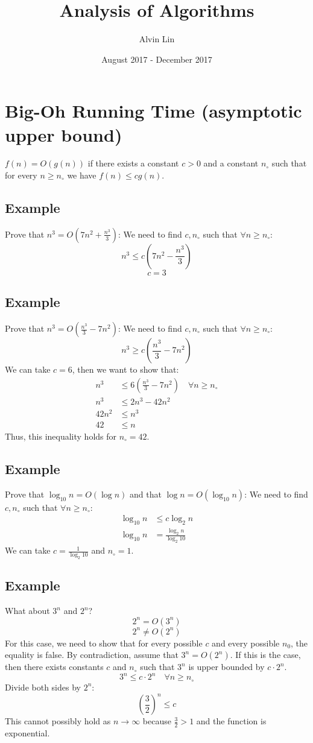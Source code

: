 \documentclass{math}
\title{Analysis of Algorithms}
\author{Alvin Lin}
\date{August 2017 - December 2017}
\begin{document}
\maketitle

\section*{Big-Oh Running Time (asymptotic upper bound)}
\( f(n) = O(g(n)) \) if there exists a constant \( c > 0 \) and a constant
\( n_{\circ} \) such that for every \( n\geq n_{\circ} \) we have
\( f(n)\leq cg(n) \).

\subsection*{Example}
Prove that \( n^3 = O(7n^2+\frac{n^3}{3}) \):
We need to find \( c,n_{\circ} \) such that \( \forall n\geq n_{\circ} \):
\[ n^3\leq c(7n^2-\frac{n^3}{3}) \]
\[ c = 3 \]

\subsection*{Example}
Prove that \( n^3 = O(\frac{n^3}{3}-7n^2) \):
We need to find \( c,n_{\circ} \) such that \( \forall n\geq n_{\circ} \):
\[ n^3\geq c(\frac{n^3}{3}-7n^2) \]
We can take \( c = 6 \), then we want to show that:
\begin{align*}
  n^3 &\leq 6(\frac{n^3}{3}-7n^2) \quad \forall n\geq n_{\circ} \\
  n^3 &\leq 2n^3-42n^2 \\
  42n^2 &\leq n^3 \\
  42 &\leq n
\end{align*}
Thus, this inequality holds for \( n_{\circ} = 42 \).

\subsection*{Example}
Prove that \( \log_{10}n = O(\log n) \) and that \( \log n = O(\log_{10}n) \):
We need to find \( c,n_{\circ} \) such that \( \forall n\geq n_{\circ} \):
\begin{align*}
  \log_{10}n &\leq c\log_{2}n \\
  \log_{10}n &= \frac{\log_{2}n}{\log_{2}10}
\end{align*}
We can take \( c = \frac{1}{\log_{2}10} \) and \( n_{\circ} = 1 \).

\subsection*{Example}
What about \( 3^n \) and \( 2^n \)?
\[ 2^n = O(3^n) \]
\[ 2^n \neq O(2^n) \]
For this case, we need to show that for every possible \( c \) and every
possible \( n_{0} \), the equality is false. By contradiction, assume that
\( 3^n = O(2^n) \). If this is the case, then there exists constants \( c \)
and \( n_{\circ} \) such that \( 3^n \) is upper bounded by \( c\cdot2^n \).
\[ 3^n \leq c\cdot2^n \quad \forall n\geq n_{\circ} \]
Divide both sides by \( 2^n \):
\[ (\frac{3}{2})^n \leq c \]
This cannot possibly hold as \( n\to\infty \) because \( \frac{3}{2} > 1 \)
and the function is exponential.
\end{document}
